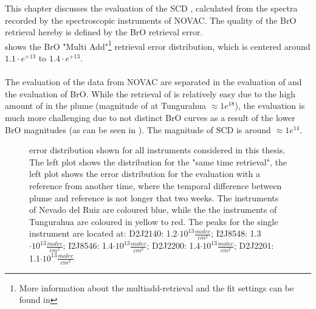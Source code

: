 This chapter discusses the evaluation of the  SCD , calculated from the spectra recorded by the spectroscopic instruments of NOVAC. The quality of the BrO retrieval hereby is defined by the BrO retrieval error.\\
 shows the BrO "Multi Add"\footnote{More information about the multiadd-retrieval and the fit settings can be found in } retrieval error distribution, which is centered around $1.1\cdot e^{+13}$ to $1.4\cdot e^{+13}$. \\
\\
The evaluation of the data from NOVAC are separated in the evaluation of  and the evaluation of BrO. While the retrieval of  is relatively easy due to the high amount of  in the plume (magnitude of  at Tungurahua $\approx 1e^{18}$), the  evaluation is much more challenging due to not distinct BrO curves as a result of the lower BrO magnitudes (as can be seen in ). The magnitude of  SCD is around $\approx 1e^{14}$. \\
%
\begin{figure}
	\caption{ error distribution shown for all instruments considered in this thesis. The left plot shows the  distribution for the "same time retrieval", the left plot shows the  error distribution for the evaluation with a reference from another time, where the temporal difference between plume and reference is not longer that two weeks. The instruments of Nevado del Ruiz are coloured blue, while the the instruments of Tungurahua are coloured in yellow to red.
		The peaks for the single instrument are located at: D2J2140: 1.2$\cdot 10^{13}\frac{molec}{cm^2}$; I2J8548: 1.3$\cdot 10^{13}\frac{molec}{cm^2}$;
		I2J8546: 1.4$\cdot 10^{13}\frac{molec}{cm^2}$;
		D2J2200: 1.4$\cdot 10^{13}\frac{molec}{cm^2}$;
		D2J2201: 1.1$\cdot 10^{13}\frac{molec}{cm^2}$}
	\label{fig:allbroerrordistribution}
\end{figure}
